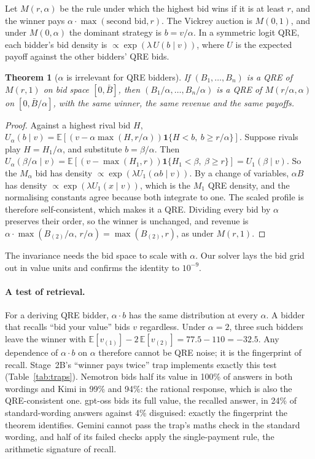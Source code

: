 \documentclass[11pt]{article}
\newtheorem{theorem}{Theorem}
\theoremstyle{definition}
\theoremstyle{remark}
\newcommand{\lam}{\lambda}
\begin{document}
Let $M(r,\alpha)$ be the rule under which the highest bid wins if it is at least $r$, and the
winner pays $\alpha\cdot\max(\text{second bid}, r)$. The Vickrey auction is $M(0,1)$, and under
$M(0,\alpha)$ the dominant strategy is $b=v/\alpha$. In a symmetric logit QRE, each bidder's bid
density is $\propto \exp(\lam\,U(b\mid v))$, where $U$ is the expected payoff against the other
bidders' QRE bids.

\begin{theorem}[$\alpha$ is irrelevant for QRE bidders]\label{thm:alpha}
If $(B_1,\dots,B_n)$ is a QRE of $M(r,1)$ on bid space $[0,\bar B]$, then
$(B_1/\alpha,\dots,B_n/\alpha)$ is a QRE of $M(r/\alpha,\alpha)$ on $[0,\bar B/\alpha]$, with the
same winner, the same revenue and the same payoffs.
\end{theorem}
\begin{proof}
Against a highest rival bid $H$, $U_\alpha(b\mid v)=\mathbb E[(v-\alpha\max(H,r/\alpha))\mathbf
1\{H<b,\ b\ge r/\alpha\}]$. Suppose rivals play $H=H_1/\alpha$, and substitute $b=\beta/\alpha$.
Then $U_\alpha(\beta/\alpha\mid v) = \mathbb E[(v-\max(H_1,r))\mathbf 1\{H_1<\beta,\ \beta\ge
r\}] = U_1(\beta\mid v)$. So the $M_\alpha$ bid has density $\propto\exp(\lam U_1(\alpha b\mid
v))$. By a change of variables, $\alpha B$ has density $\propto\exp(\lam U_1(x\mid v))$, which is
the $M_1$ QRE density, and the normalising constants agree because both integrate to one. The
scaled profile is therefore self-consistent, which makes it a QRE. Dividing every bid by $\alpha$
preserves their order, so the winner is unchanged, and revenue is
$\alpha\cdot\max(B_{(2)}/\alpha,\,r/\alpha)=\max(B_{(2)},r)$, as under $M(r,1)$.
\end{proof}

The invariance needs the bid space to scale with $\alpha$. Our solver lays the bid grid out in
value units and confirms the identity to $10^{-9}$.

\paragraph{A test of retrieval.} For a deriving QRE bidder, $\alpha\cdot b$ has the same
distribution at every $\alpha$. A bidder that recalls ``bid your value'' bids $v$ regardless. Under
$\alpha=2$, three such bidders leave the winner with
$\mathbb E[v_{(1)}]-2\,\mathbb E[v_{(2)}]=77.5-110=-32.5$. Any dependence of $\alpha\cdot b$ on
$\alpha$ therefore cannot be QRE noise; it is the fingerprint of recall. Stage~2B's ``winner pays
twice'' trap implements exactly this test (Table~\ref{tab:traps}). Nemotron bids half its value
in 100\% of answers in both wordings and Kimi in 99\% and 94\%: the rational response, which is
also the QRE-consistent one. gpt-oss bids its full value, the recalled answer, in 24\% of
standard-wording answers against 4\% disguised: exactly the fingerprint the theorem identifies.
Gemini cannot pass the trap's maths check in the standard wording, and half of its failed checks
apply the single-payment rule, the arithmetic signature of recall.
\end{document}
